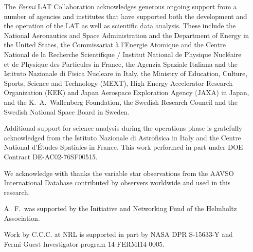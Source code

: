 \documentclass{aa} %
\begin{document}
The \textit{Fermi} LAT Collaboration acknowledges generous ongoing support
from a number of agencies and institutes that have supported both the
development and the operation of the LAT as well as scientific data analysis.
These include the National Aeronautics and Space Administration and the
Department of Energy in the United States, the Commissariat \`a l'Energie Atomique
and the Centre National de la Recherche Scientifique / Institut National de Physique
Nucl\'eaire et de Physique des Particules in France, the Agenzia Spaziale Italiana
and the Istituto Nazionale di Fisica Nucleare in Italy, the Ministry of Education,
Culture, Sports, Science and Technology (MEXT), High Energy Accelerator Research
Organization (KEK) and Japan Aerospace Exploration Agency (JAXA) in Japan, and
the K.~A.~Wallenberg Foundation, the Swedish Research Council and the
Swedish National Space Board in Sweden.
 
Additional support for science analysis during the operations phase is gratefully
acknowledged from the Istituto Nazionale di Astrofisica in Italy and the Centre
National d'\'Etudes Spatiales in France. This work performed in part under DOE
Contract DE-AC02-76SF00515.

We acknowledge with thanks the variable
star observations from the AAVSO International
Database contributed by observers worldwide and used
in this research.

A.~F.~was supported by the Initiative and Networking Fund of the Helmholtz Association.

Work by C.C.C. at NRL is supported in part by NASA DPR S-15633-Y and Fermi Guest Investigator program 14-FERMI14-0005.


\onecolumn
\appendix
\end{document}
